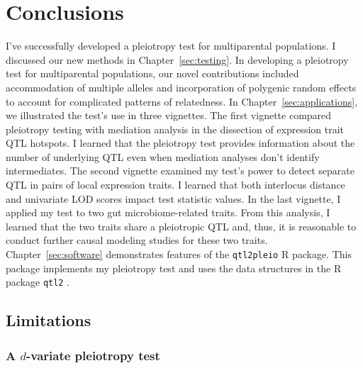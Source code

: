 \chapter{Conclusions}

I've successfully developed a pleiotropy test for multiparental populations.
I discussed our new methods in Chapter~\ref{sec:testing}. In developing a pleiotropy test 
for multiparental populations, our novel contributions included accommodation of multiple 
alleles and incorporation of polygenic random effects to account for complicated patterns 
of relatedness. 
In Chapter~\ref{sec:applications}, we illustrated the test's use in three vignettes.
The first vignette compared pleiotropy testing with mediation analysis
in the dissection of expression trait QTL hotspots.
I learned that the pleiotropy test provides information about the
number of underlying QTL even when mediation analyses don't identify intermediates. 
The second vignette examined my test's power to detect separate QTL
in pairs of local expression traits.
I learned that both interlocus distance and univariate LOD scores
impact test statistic values. 
In the last vignette, I applied my test to two gut microbiome-related traits.
From this analysis, I learned that the two traits share a pleiotropic QTL and, thus,
it is reasonable to conduct further causal modeling studies for these two traits.
Chapter~\ref{sec:software} demonstrates features of the \texttt{qtl2pleio} R package.
This package implements my pleiotropy test and uses the data structures in the R package \texttt{qtl2} \citep{broman2019rqtl2}.

\section{Limitations}

\subsection{A $d$-variate pleiotropy test}

